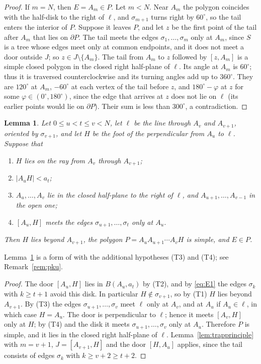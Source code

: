 \documentclass[11pt]{amsart}
\newtheorem{lemma}[theorem]{Lemma}
\theoremstyle{definition}
\theoremstyle{remark}
\numberwithin{equation}{section}
\begin{document}
\begin{proof}
If $m=N$, then $E=A_m\in P$. Let $m<N$. Near $A_m$ the polygon coincides with the half-disk to the right of $\ell$, and $\sigma_{m+1}$ turns right by $60^\circ$, so the tail enters the interior of $P$. Suppose it leaves $P$, and let $z$ be the first point of the tail after $A_m$ that lies on $\partial P$. The tail meets the edges $\sigma_1,\dots,\sigma_m$ only at $A_m$, since $S$ is a tree whose edges meet only at common endpoints, and it does not meet a door outside $J$; so $z\in J\setminus\{A_m\}$. The tail from $A_m$ to $z$ followed by $[z,A_m]$ is a simple closed polygon in the closed right half-plane of $\ell$. Its angle at $A_m$ is $60^\circ$; thus it is traversed counterclockwise and its turning angles add up to $360^\circ$. They are $120^\circ$ at $A_m$, $-60^\circ$ at each vertex of the tail before $z$, and $180^\circ-\varphi$ at $z$ for some $\varphi\in(0^\circ,180^\circ)$, since the edge that arrives at $z$ does not lie on $\ell$ (its earlier points would lie on $\partial P$). Their sum is less than $300^\circ$, a contradiction.
\end{proof}

\begin{lemma}\label{lem:T}
Let $0\le u<t\le v<N$, let $\ell$ be the line through $A_v$ and $A_{v+1}$, oriented by $\sigma_{v+1}$, and let $H$ be the foot of the perpendicular from $A_u$ to $\ell$. Suppose that
\begin{enumerate}[label=\textup{(T\arabic*)}]
\item $H$ lies on the ray from $A_v$ through $A_{v+1}$;
\item $|A_uH|<a_t$;
\item $A_u,\dots,A_v$ lie in the closed half-plane to the right of $\ell$, and $A_{u+1},\dots,A_{v-1}$ in the open one;
\item $[A_u,H]$ meets the edges $\sigma_{u+1},\dots,\sigma_t$ only at $A_u$.
\end{enumerate}
Then $H$ lies beyond $A_{v+1}$, the polygon $P=A_uA_{u+1}\cdots A_vH$ is simple, and $E\in P$.
\end{lemma}

Lemma~\ref{lem:T} is a form of \cite[Lemma~8]{KHSHGW} with the additional hypotheses (T3) and (T4); see Remark~\ref{rem:pku}.

\begin{proof}
The door $[A_u,H]$ lies in $B(A_u,a_t)$ by (T2), and by \eqref{eq:E1} the edges $\sigma_k$ with $k\ge t+1$ avoid this disk. In particular $H\notin\sigma_{v+1}$, so by (T1) $H$ lies beyond $A_{v+1}$. By (T3) the edges $\sigma_{u+1},\dots,\sigma_v$ meet $\ell$ only at $A_v$, and at $A_u$ if $A_u\in\ell$, in which case $H=A_u$. The door is perpendicular to $\ell$; hence it meets $[A_v,H]$ only at $H$; by (T4) and the disk it meets $\sigma_{u+1},\dots,\sigma_v$ only at $A_u$. Therefore $P$ is simple, and it lies in the closed right half-plane of $\ell$. Lemma~\ref{lem:trapprinciple} with $m=v+1$, $J=[A_{v+1},H]$ and the door $[H,A_u]$ applies, since the tail consists of edges $\sigma_k$ with $k\ge v+2\ge t+2$.
\end{proof}
\end{document}
